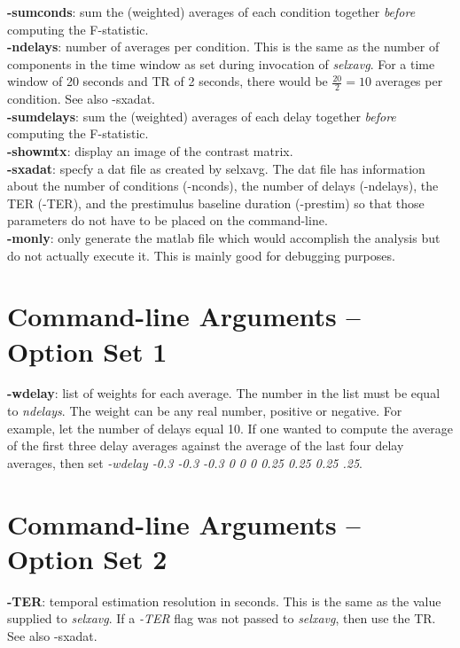\documentclass[10pt]{article}
\begin{document}
\noindent
{\bf -sumconds}: sum the (weighted) averages of each condition
together {\em before} computing the F-statistic.\\

\noindent
{\bf -ndelays}: number of averages per condition.  This is the same as
the number of components in the time window as set during invocation
of {\em selxavg}.  For a time window of 20 seconds and TR of 2
seconds, there would be $\frac{20}{2} = 10$ averages per condition.
See also -sxadat.\\

\noindent
{\bf -sumdelays}: sum the (weighted) averages of each delay
together {\em before} computing the F-statistic.\\

\noindent
{\bf -showmtx}: display an image of the contrast matrix.\\

\noindent
{\bf -sxadat}: specfy a dat file as created by selxavg.  The dat file
has information about the number of conditions (-nconds), the number
of delays (-ndelays), the TER (-TER), and the prestimulus baseline
duration (-prestim) so that those parameters do not have to be placed
on the command-line.\\

\noindent
{\bf -monly}: only generate the matlab file which would accomplish the
analysis but do not actually execute it.  This is mainly good for
debugging purposes.\\

\section{Command-line Arguments -- Option Set 1}

\noindent
{\bf -wdelay}: list of weights for each average.  The number in the
list must be equal to {\em ndelays}. The weight can be any real
number, positive or negative.  For example, let the number of delays
equal 10. If one wanted to compute the average of the first three
delay averages against the average of the last four delay averages,
then set {\em -wdelay -0.3 -0.3 -0.3 0 0 0 0.25 0.25 0.25 .25}.\\

\section{Command-line Arguments -- Option Set 2}

\noindent
{\bf -TER}: temporal estimation resolution in seconds.  This is the
same as the value supplied to {\em selxavg}.  If a {\em -TER} flag was
not passed to {\em selxavg}, then use the TR. See also -sxadat.\\
\end{document}
